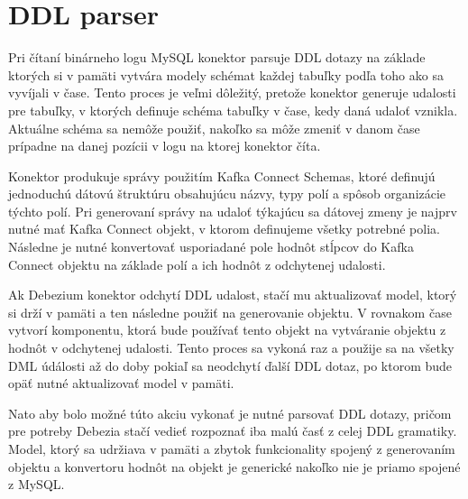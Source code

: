 
\section{DDL parser}
Pri čítaní binárneho logu MySQL konektor parsuje DDL dotazy na základe ktorých si v pamäti vytvára modely schémat každej tabuľky podľa toho ako sa vyvíjali v čase. Tento proces je veľmi dôležitý, pretože konektor generuje udalosti pre tabuľky, v ktorých definuje schéma tabuľky v čase, kedy daná udaloť vznikla. Aktuálne schéma sa nemôže použiť, nakoľko sa môže zmeniť v danom čase prípadne na danej pozícii v logu na ktorej konektor číta. 

Konektor produkuje správy použitím Kafka Connect Schemas, ktoré definujú jednoduchú dátovú štruktúru obsahujúcu názvy, typy polí a spôsob organizácie týchto polí. Pri generovaní správy na udaloť týkajúcu sa dátovej zmeny je najprv nutné mať Kafka Connect  objekt, v ktorom definujeme všetky potrebné polia. Následne je nutné konvertovať usporiadané pole hodnôt stĺpcov do Kafka Connect  objektu na základe polí a ich hodnôt z odchytenej udalosti.

Ak Debezium konektor odchytí DDL udalost, stačí mu aktualizovať model, ktorý si drží v pamäti a ten následne použiť na generovanie  objektu. V rovnakom čase vytvorí komponentu, ktorá bude používať tento  objekt na vytváranie  objektu z hodnôt v odchytenej udalosti. Tento proces sa vykoná raz a použije sa na všetky DML údálosti až do doby pokiaľ sa neodchytí ďalší DDL dotaz, po ktorom bude opäť nutné aktualizovať model v pamäti.

Nato aby bolo možné túto akciu vykonať je nutné parsovať DDL dotazy, pričom pre potreby Debezia stačí vedieť rozpoznať iba malú časť z celej DDL gramatiky. Model, ktorý sa udržiava v pamäti a zbytok funkcionality spojený z generovaním  objektu a konvertoru hodnôt na  objekt je generické nakoľko nie je priamo spojené z MySQL.

